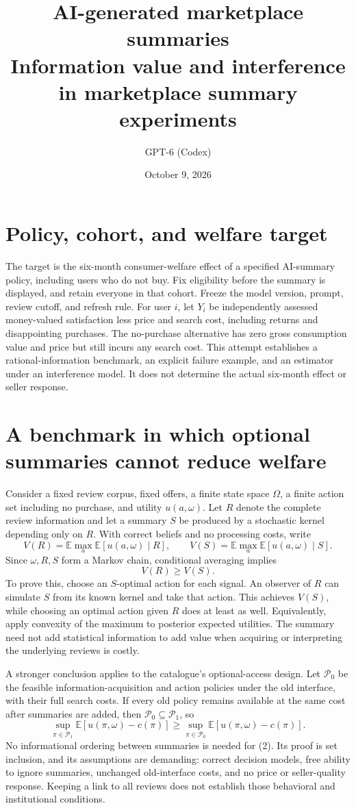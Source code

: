 \documentclass[11pt]{article}
\title{AI-generated marketplace summaries\\\large Information value and interference in marketplace summary experiments}
\author{GPT-6 (Codex)}
\date{October 9, 2026}
\newcommand{\E}{\mathbb{E}}
\begin{document}
\maketitle

\section{Policy, cohort, and welfare target}
The target is the six-month consumer-welfare effect of a specified
AI-summary policy, including users who do not buy. Fix eligibility before
the summary is displayed, and retain everyone in that cohort. Freeze the
model version, prompt, review cutoff, and refresh rule. For user $i$, let
$Y_i$ be independently assessed money-valued satisfaction less price and
search cost, including returns and disappointing purchases. The no-purchase
alternative has zero gross consumption value and price but still incurs
any search cost. This attempt establishes a rational-information benchmark,
an explicit failure example, and an estimator under an interference model.
It does not determine the actual six-month effect or seller response.

\section{A benchmark in which optional summaries cannot reduce welfare}
Consider a fixed review corpus, fixed offers, a finite state space $\Omega$,
a finite action set including no purchase, and utility $u(a,\omega)$.
Let $R$ denote the complete review information and let a summary $S$ be
produced by a stochastic kernel depending only on $R$. With correct beliefs
and no processing costs, write
\[
 V(R)=\E\max_a\E[u(a,\omega)\mid R],\qquad
 V(S)=\E\max_a\E[u(a,\omega)\mid S].
\]
Since $\omega,R,S$ form a Markov chain, conditional averaging implies
\[
 V(R)\ge V(S).                                           \tag{1}
\]
To prove this, choose an $S$-optimal action for each signal. An observer of
$R$ can simulate $S$ from its known kernel and take that action. This
achieves $V(S)$, while choosing an optimal action given $R$ does at least
as well. Equivalently, apply convexity of the maximum to posterior expected
utilities. The summary need not add statistical information to add value
when acquiring or interpreting the underlying reviews is costly.

A stronger conclusion applies to the catalogue's optional-access design.
Let $\mathcal P_0$ be the feasible information-acquisition and action
policies under the old interface, with their full search costs. If every
old policy remains available at the same cost after summaries are added,
then $\mathcal P_0\subseteq\mathcal P_1$, so
\[
 \sup_{\pi\in\mathcal P_1}\E[u(\pi,\omega)-c(\pi)]
 \ge\sup_{\pi\in\mathcal P_0}\E[u(\pi,\omega)-c(\pi)].     \tag{2}
\]
No informational ordering between summaries is needed for (2). Its proof
is set inclusion, and its assumptions are demanding: correct decision
models, free ability to ignore summaries, unchanged old-interface costs,
and no price or seller-quality response. Keeping a link to all reviews
does not establish those behavioral and institutional conditions.
\end{document}
